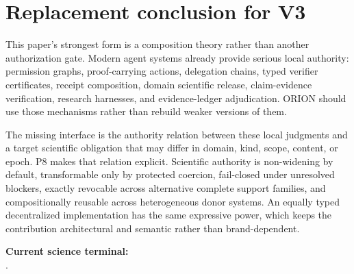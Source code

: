 \section{Replacement conclusion for V3}

This paper's strongest form is a composition theory rather than another authorization gate. Modern agent systems already provide serious local authority: permission graphs, proof-carrying actions, delegation chains, typed verifier certificates, receipt composition, domain scientific release, claim-evidence verification, research harnesses, and evidence-ledger adjudication. ORION should use those mechanisms rather than rebuild weaker versions of them.

The missing interface is the authority relation between these local judgments and a target scientific obligation that may differ in domain, kind, scope, content, or epoch. P8 makes that relation explicit. Scientific authority is non-widening by default, transformable only by protected coercion, fail-closed under unresolved blockers, exactly revocable across alternative complete support families, and compositionally reusable across heterogeneous donor systems. An equally typed decentralized implementation has the same expressive power, which keeps the contribution architectural and semantic rather than brand-dependent.

\medskip

\noindent\textbf{Current science terminal:}\\
.
